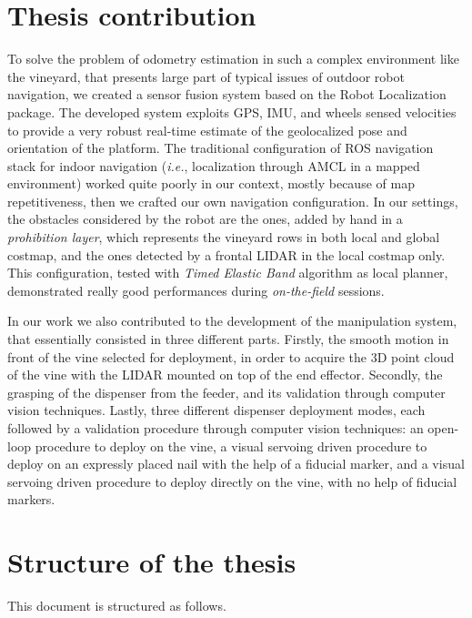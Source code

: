 \section{Thesis contribution}
To solve the problem of odometry estimation in such a complex environment like the vineyard, that presents large part of typical issues of outdoor robot navigation, we created a sensor fusion system based on the Robot Localization package. The developed system exploits GPS, \ac{IMU}, and wheels sensed velocities to provide a very robust real-time estimate of the geolocalized pose and orientation of the platform. The traditional configuration of \ac{ROS} navigation stack for indoor navigation (\textit{i.e.}, localization through \ac{AMCL} in a mapped environment) worked quite poorly in our context, mostly because of map repetitiveness, then we crafted our own navigation configuration. In our settings, the obstacles considered by the robot are the ones, added by hand in a \textit{prohibition layer}, which represents the vineyard rows in both local and global costmap, and the ones detected by a frontal \ac{LIDAR} in the local costmap only. 
This configuration, tested with \textit{Timed Elastic Band} algorithm as local planner, demonstrated really good performances during \textit{on-the-field} sessions.
\par In our work we also contributed to the development of the manipulation system, that essentially consisted in three different parts. Firstly, the smooth motion in front of the vine selected for deployment, in order to acquire the 3D point cloud of the vine with the \ac{LIDAR} mounted on top of the end effector. Secondly, the grasping of the dispenser from the feeder, and its validation through computer vision techniques. Lastly, three different dispenser deployment modes, each followed by a validation procedure through computer vision techniques: an open-loop procedure to deploy on the vine, a visual servoing driven procedure to deploy on an expressly placed nail with the help of a fiducial marker, and a visual servoing driven procedure to deploy directly on the vine, with no help of fiducial markers.


\section{Structure of the thesis}
This document is structured as follows.

